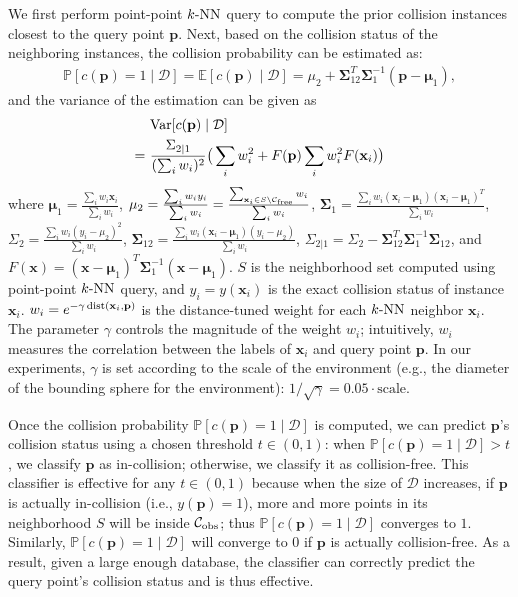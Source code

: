 We first perform point-point $k\text{-NN}$ query to compute the prior collision instances closest to the query point $\mathbf p$. Next, based on the collision status of the neighboring instances, the collision probability can be estimated as:
\begin{align}
  \label{eq:3:knnclassifier}
  \mathbb P[c(\mathbf p) = 1 \mid \mathcal D] = \mathbb E[c(\mathbf p) \mid \mathcal D] = \mu_2 + \boldsymbol \Sigma_{12}^T  \boldsymbol\Sigma_1^{-1} (\mathbf p - \boldsymbol \mu_1),
\end{align}
and the variance of the estimation can be given as
\begin{align}
\label{eq:3:knnclassifiervar}
& \ \textrm{Var}[c(\mathbf p) \mid \mathcal D] \\ \notag
=& \ \frac{\Sigma_{2|1}}{(\sum_i w_i)^2} \big( \sum_i w_i^2 + F(\mathbf p) \sum_i w_i^2 F(\mathbf x_i) \big)
\end{align}
where $\boldsymbol \mu_1 = \frac{\sum_i w_i \mathbf x_i}{\sum_i w_i}$, $\mu_2 = \frac{\sum_i w_i y_i}{\sum_i w_i} = \frac{\sum_{\mathbf x_i \in S \setminus \mathcal C_{\text{free}}}w_i}{\sum_i w_i}$, $\boldsymbol \Sigma_1 = \frac{\sum_i w_i (\mathbf x_i - \boldsymbol \mu_1)(\mathbf x_i - \boldsymbol \mu_1)^T}{\sum_i w_i}$, \\ $\Sigma_2 = \frac{\sum_i w_i (y_i - \mu_2)^2}{\sum_i w_i}$, $\boldsymbol \Sigma_{12} = \frac{\sum_i w_i (\mathbf x_i - \boldsymbol \mu_1)(y_i - \mu_2)}{\sum_i w_i}$, $\Sigma_{2|1} = \Sigma_2 - \boldsymbol \Sigma_{12}^T \boldsymbol \Sigma_1^{-1} \boldsymbol \Sigma_{12}$, and $F(\mathbf x) = (\mathbf x - \boldsymbol \mu_1)^T \boldsymbol \Sigma_1^{-1} (\mathbf x - \boldsymbol \mu_1)$.
$S$ is the neighborhood set computed using point-point $k\text{-NN}$ query, and $y_i = y(\mathbf x_i)$ is the exact collision status of instance $\mathbf x_i$. $w_i = e^{-\gamma \operatorname{dist}(\mathbf x_i, \mathbf p)}$ is the distance-tuned weight for each $k\text{-NN}$ neighbor $\mathbf x_i$. The parameter $\gamma$ controls the magnitude of the weight $w_i$; intuitively, $w_i$ measures the
correlation between the labels of $\mathbf x_i$ and query point $\mathbf p$. In our experiments, $\gamma$ is set according to the scale of the environment (e.g., the diameter of the bounding sphere for the environment): $1/\sqrt{\gamma} = 0.05 \cdot \text{scale}$.

Once the collision probability $\mathbb P[c(\mathbf p) = 1 \mid \mathcal D]$ is computed, we can predict $\mathbf p$'s collision status using a chosen threshold $t \in (0, 1)$: when $\mathbb P[c(\mathbf p) = 1 \mid \mathcal D] > t$, we classify $\mathbf p$ as in-collision; otherwise, we classify it as collision-free. This classifier is effective for any $t \in (0, 1)$ because when the size of $\mathcal D$ increases, if $\mathbf p$ is actually in-collision (i.e., $y(\mathbf p) = 1$), more and more points in its neighborhood $S$ will be inside $\mathcal C_{\text{obs}}$; thus $\mathbb P[c(\mathbf p) = 1 \mid \mathcal D]$ converges to $1$. Similarly, $\mathbb P[c(\mathbf p) = 1 \mid \mathcal D]$ will converge to $0$ if $\mathbf p$ is actually collision-free. As a result, given a large enough database, the classifier can correctly predict the query point's collision status and is thus effective.

